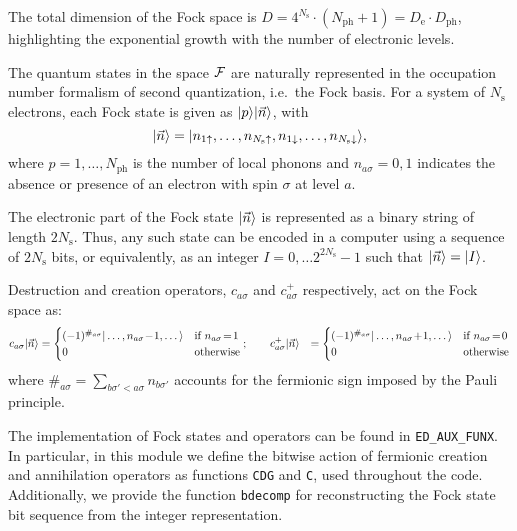 \documentclass[edipack2.tex]{subfiles}
\begin{document}
The total dimension of the Fock space is
$D=4^{N_\mathrm{s}}\cdot (N_\mathrm{ph}+1)=D_\mathrm{e}\cdot
D_\mathrm{ph}$, highlighting the exponential
growth with the number of electronic levels. 

The quantum states in the space ${\cal F}$ are naturally represented in
the occupation number formalism of second quantization,
i.e.~the Fock basis.
For a system of $N_\mathrm{s}$ electrons, each Fock state
is given as $|p\rangle|\vec{n}\rangle$, with
\begin{equation} \label{eq:FockState_|nupndw>}
    |\vec{n}\rangle=|n_{1\uparrow},\dots,n_{N_\mathrm{s}\uparrow},n_{1\downarrow},\dots,n_{N_\mathrm{s}\downarrow}\rangle,
\end{equation}
where $p=1,\dots,N_\mathrm{ph}$ is the number of local phonons and
$n_{a\sigma}=0,1$ indicates the absence or 
presence of an electron with spin $\sigma$ at level $a$.

The electronic part of the Fock state $|\vec{n}\rangle$ is represented
as a binary string of length $2N_\mathrm{s}$. Thus, any such state can be encoded
in a computer using a sequence of $2N_\mathrm{s}$ bits, or equivalently, as an integer $I=0,\dots 2^{2N_\mathrm{s}}-1$ such that $|\vec{n}\rangle=|I\rangle$.  

Destruction and creation operators, $c_{a\sigma}$ and $c^+_{a\sigma}$ 
respectively, act on the Fock space as:
\begin{align*}
  c_{a\sigma}\ket{\vec{n}} &=
    \begin{cases}
      (-1)^{\#_{a\sigma}}\ket{\dots,n_{a\sigma}\!-\!1,\dots}
      &\text{if $n_{a\sigma}\!=\! 1$}\\
      0 &\text{otherwise}
    \end{cases};\qquad
    c^{+}_{a\sigma}\ket{\vec{n}} &=
     \begin{cases}
      (-1)^{\#_{a\sigma}}\ket{\dots,n_{a\sigma}\!+\!1,\dots}
      & \text{if $n_{a\sigma}\!=\! 0$}\\
      0 & \text{otherwise}
    \end{cases}    
\end{align*}
where $\#_{a\sigma}=\sum_{b\sigma'<a\sigma} n_{b\sigma'}$ accounts for the fermionic sign imposed by the Pauli principle.


The implementation of Fock states and operators can be found in 
{\tt ED\_AUX\_FUNX}. In particular, in this module we define the bitwise action 
of fermionic creation and annihilation operators as functions 
{\tt CDG} and {\tt C}, used throughout the code. Additionally, 
we provide the function {\tt bdecomp} for reconstructing the Fock 
state bit sequence from the integer representation.
\end{document}
